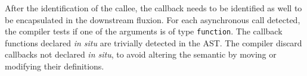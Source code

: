 After the identification of the callee, the callback needs to be identified as well to be encapsulated in the downstream fluxion.
For each asynchronous call detected, the compiler tests if one of the arguments is of type \texttt{function}.
The callback functions declared \textit{in situ} are trivially detected in the AST.
The compiler discard callbacks not declared \textit{in situ}, to avoid altering the semantic by moving or modifying their definitions.





